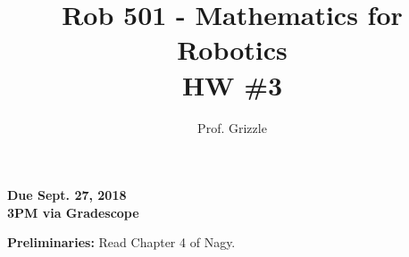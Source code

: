 \documentclass[letterpaper]{article}
\author{Prof. Grizzle}
\title{Rob 501 - Mathematics for Robotics\\
HW \#3}
\begin{document}
\date{}
\maketitle


 \newcommand{\trace}{\mathrm{trace}}
\newcommand{\real}{\mathbb R}  %
\newcommand{\nat}{\mathbb N}   %
\newcommand{\cp}{\mathbb C}    %
\newcommand{\ds}{\displaystyle}
\newcommand{\mf}[2]{\frac{\ds #1}{\ds #2}}
\newcommand{\Nagy}[2]{{Nagy, Page~#1, }{Prob.~#2}}
\newcommand{\spanof}[1]{\textrm{span} \{ #1 \}}
\parindent 0pt


\begin{flushright}
{\bfseries Due Sept. 27, 2018} \\
{\bfseries 3PM via Gradescope} \\[3mm]
\end{flushright}

\noindent \textbf{Preliminaries:}  Read Chapter 4 of Nagy.


\end{document}
